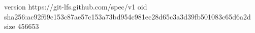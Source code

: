 version https://git-lfs.github.com/spec/v1
oid sha256:ac92f69c153c87ae57c153a73bd954c981ec28d65c3a3d39fb501083c65d6a2d
size 456653
